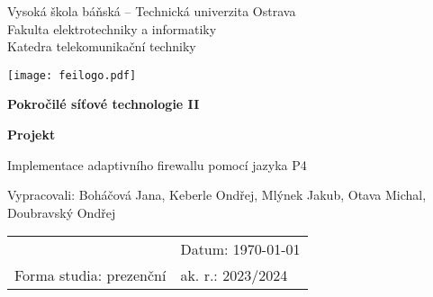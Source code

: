 \begin{titlepage}
	\begin{center}
		\LARGE
		Vysoká škola báňská – Technická univerzita Ostrava\\
		Fakulta elektrotechniky a informatiky\\
		Katedra telekomunikační techniky
		
		\vspace*{1cm}
		
		\texttt{[image: feilogo.pdf]}
		
		\Huge
		\textbf{Pokročilé síťové technologie II}
		
		\vspace{0.5cm}
		\Huge
		\textbf{Projekt}
		
		\vspace{1.5cm}
		
		\Huge
		Implementace adaptivního firewallu pomocí jazyka P4
		
		\vfill

		
		\vspace{0.8cm}
		
	\end{center}
    \vspace{0.8cm}
	\Large
    Vypracovali: Boháčová Jana, Keberle Ondřej, Mlýnek Jakub, Otava Michal, Doubravský Ondřej
	\begin{center}	
        \begin{tabularx}{\textwidth} { 
				 >{\raggedright\arraybackslash}X  
				 >{\raggedleft\arraybackslash}X  }
			      \\  & Datum: \kratkyDatum\today\\                 %
			     Forma studia: prezenční & ak. r.: 2023/2024
		\end{tabularx}
	\end{center}

\end{titlepage}